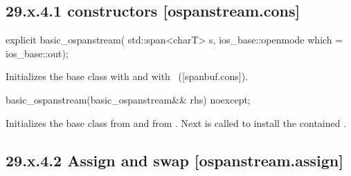 \documentclass[ebook,11pt,article]{memoir}
\renewcommand{\iref}[1]{[#1]}
\begin{document}

\subsection{29.x.4.1  constructors [ospanstream.cons]}
\label{ospanstream.cons}

\begin{itemdecl}
explicit basic_ospanstream(
  std::span<charT> s,
  ios_base::openmode which = ios_base::out);
\end{itemdecl}

\begin{itemdescr}
\pnum
\effects
Initializes the base class with
and  with
~(\iref{spanbuf.cons}).
\end{itemdescr}

\begin{itemdecl}
basic_ospanstream(basic_ospanstream&& rhs) noexcept;
\end{itemdecl}

\begin{itemdescr}
\pnum
\effects 
Initializes the base class from  
and  from .
Next  is called to
install the contained .
\end{itemdescr}

\subsection{29.x.4.2 Assign and swap [ospanstream.assign]}
\label{ospanstream.assign}
\end{document}
